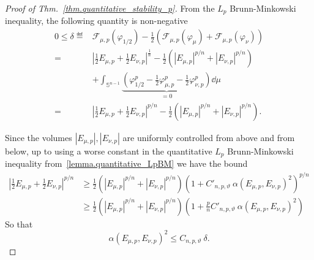 \documentclass[a4paper, 10pt, twoside]{amsart}
\numberwithin{equation}{section}
\theoremstyle{plain}
\theoremstyle{definition}
\begin{document}
\begin{proof}[Proof of Thm.~\ref{thm.quantitative_stability_p}]
    From the $L_p$ Brunn-Minkowski inequality, the following quantity is non-negative
    \begin{equation}\label{eq.def_delta}
        \begin{aligned}
            0 
            \le \delta 
            \eqdef&
            \mathscr{F}_{\mu,p}(\varphi_{1/2}) 
            - 
            \frac{1}{2}\left(
                \mathscr{F}_{\mu,p}(\varphi_{\mu}) + \mathscr{F}_{\mu,p}(\varphi_{\nu})
            \right)\\ 
            =& 
            {\left|\frac{1}{2}E_{\mu,p} + \frac{1}{2}E_{\nu,p}\right|}^{\frac{1}{n}} 
            - 
            \frac{1}{2}\left(
                |E_{\mu,p}|^{p/n} + |E_{\nu,p}|^{p/n}
            \right)\\
            &+ 
            \int_{\mathbb{S}^{n-1}}
            \underbrace{
            \left(
                    \varphi_{1/2}^p 
                    -\frac{1}{2}\varphi_{\mu,p}^p
                    -\frac{1}{2}\varphi_{\nu,p}^p
                \right)  
            }_{=0} \dd \mu \\ 
            =& 
            {\left|\frac{1}{2}E_{\mu,p} + \frac{1}{2}E_{\nu,p}\right|}^{p/n} 
            - 
            \frac{1}{2}\left(
                |E_{\mu,p}|^{p/n} + |E_{\nu,p}|^{p/n}
            \right).
        \end{aligned}
    \end{equation}

    Since the volumes $|E_{\mu,p}|,|E_{\nu,p}|$ are uniformly controlled from above and from below, up to using a worse constant in the quantitative $L_p$ Brunn-Minkowski inequality from~\ref{lemma.quantitative_LpBM} we have the bound
    \begin{equation}
        \begin{aligned}
            {\left|\frac{1}{2}E_{\mu,p} + \frac{1}{2}E_{\nu,p}\right|}^{p/n} 
            &\ge 
            \frac{1}{2}\left(
                |E_{\mu,p}|^{p/n} + |E_{\nu,p}|^{p/n}
            \right) 
            \left(
                1 + C'_{n,p,\vartheta}\ \alpha(E_{\mu,p},E_{\nu,p})^2
            \right)^{p/n}\\ 
            &\ge
            \frac{1}{2}\left(
                |E_{\mu,p}|^{p/n} + |E_{\nu,p}|^{p/n}
            \right) 
            \left(
                1 + \frac{p}{n}C'_{n,p,\vartheta}\  \alpha(E_{\mu,p},E_{\nu,p})^2
            \right)
        \end{aligned}
    \end{equation}
    So that 
    \begin{equation}\label{eq.control_Fraenkel_Lp}
        \alpha(E_{\mu,p},E_{\nu,p})^2 \le C_{n,p,\vartheta}\ \delta. 
    \end{equation}


\end{proof}
\end{document}
